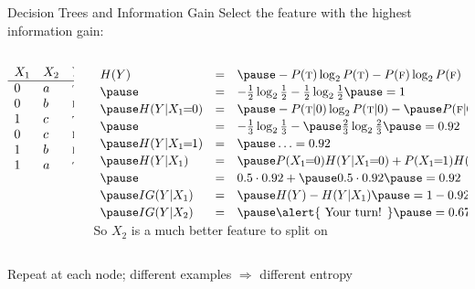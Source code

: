 \documentclass[14pt]{beamer}
\begin{document}
\begin{frame}{Decision Trees and Information Gain}
Select the feature with the highest information gain:\\
\medskip
\begin{columns}[T]
\begin{column}{0.14\textwidth}
\setlength{\arraycolsep}{0.1em}
\small
$
\begin{array}{ l l l }
X_1 & X_2 & Y \\
\hline
0   & a   & \textsc{t} \\
0   & b   & \textsc{f} \\
1   & c   & \textsc{t} \\
0   & c   & \textsc{f} \\
1   & b   & \textsc{f} \\
1   & a   & \textsc{t} \\
\end{array}
$
\end{column}
\pause
\begin{column}{0.83\textwidth}
\setlength{\arraycolsep}{0.1em}
\small
$
\extrarowheight=2pt
\begin{array}{ l l l l }
H(Y)
& = & \pause -P(\textsc{t})\log_2 P(\textsc{t}) - P(\textsc{f})\log_2 P(\textsc{f}) \\
\pause
& = & -\frac{1}{2}\log_2 \frac{1}{2} - \frac{1}{2}\log_2 \frac{1}{2} \pause = 1 \\
\pause
H(Y|X_1\!\!=\!\!0)
& = & \pause -P(\textsc{t}|0)\log_2 P(\textsc{t}|0) - \pause P(\textsc{f}|0)\log_2 P(\textsc{f}|0) \\
\pause
& = & - \frac{1}{3}\log_2 \frac{1}{3} - \pause \frac{2}{3}\log_2 \frac{2}{3} \pause = 0.92\\
\pause         
H(Y|X_1\!\!=\!\!1)
& = & \pause \ldots = 0.92\\
\pause         
H(Y|X_1)
& = & \pause P(X_1\!\!=\!\!0) H(Y|X_1\!\!=\!\!0) + P(X_1\!\!=\!\!1) H(Y|X_1\!\!=\!\!1) \\
\pause         
& = & 0.5 \cdot 0.92 + \pause 0.5 \cdot 0.92 \pause = 0.92 \\
\pause
IG(Y|X_1)
& = & \pause H(Y) - H(Y|X_1) \pause = 1 - 0.92 \pause = 0.08 \\
\pause         
IG(Y|X_2)
& = & \pause \mbox{\alert{ Your turn! }} \pause = 0.67 \\
\end{array}
$ \\
\medskip
\pause
So $X_2$ is a much better feature to split on
\end{column}
\end{columns}
\pause
\bigskip
Repeat at each node; different examples $\Rightarrow$ different entropy
\end{frame}
\end{document}
